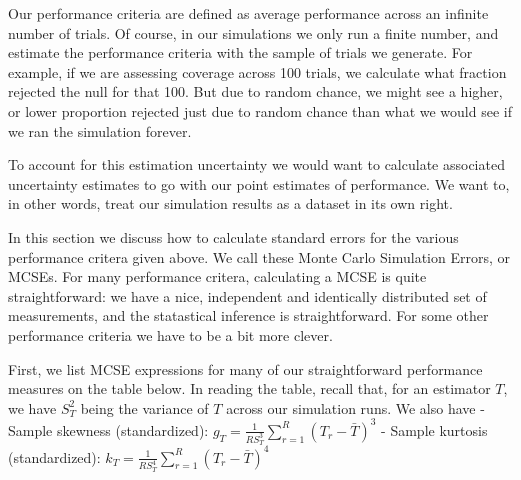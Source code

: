 \documentclass[
]{book}
\begin{document}
Our performance criteria are defined as average performance across an infinite number of trials.
Of course, in our simulations we only run a finite number, and estimate the performance criteria with the sample of trials we generate.
For example, if we are assessing coverage across 100 trials, we calculate what fraction rejected the null for that 100.
But due to random chance, we might see a higher, or lower proportion rejected just due to random chance than what we would see if we ran the simulation forever.

To account for this estimation uncertainty we would want to calculate associated uncertainty estimates to go with our point estimates of performance.
We want to, in other words, treat our simulation results as a dataset in its own right.

In this section we discuss how to calculate standard errors for the various performance critera given above.
We call these Monte Carlo Simulation Errors, or MCSEs.
For many performance critera, calculating a MCSE is quite straightforward: we have a nice, independent and identically distributed set of measurements, and the statastical inference is straightforward.
For some other performance criteria we have to be a bit more clever.

First, we list MCSE expressions for many of our straightforward performance measures on the table below.
In reading the table, recall that, for an estimator \(T\), we have \(S_T^2\) being the variance of \(T\) across our simulation runs.
We also have
- Sample skewness (standardized): \(\displaystyle{g_T = \frac{1}{R S_T^3}\sum_{r=1}^R \left(T_r - \bar{T}\right)^3}\)
- Sample kurtosis (standardized): \(\displaystyle{k_T = \frac{1}{R S_T^4} \sum_{r=1}^R \left(T_r - \bar{T}\right)^4}\)
\end{document}
